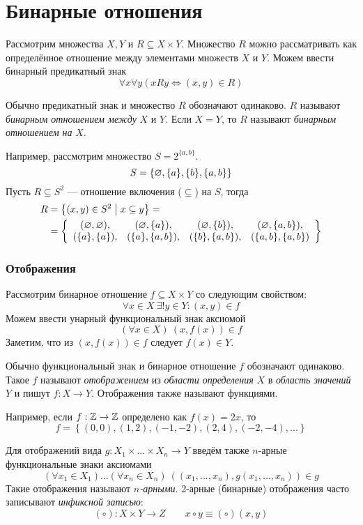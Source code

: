 \part{Бинарные отношения}

Рассмотрим множества $X,Y$ и $R\subseteq X\times Y$. Множество $R$ можно рассматривать
как определённое отношение между элементами множеств $X$ и $Y$. Можем ввести бинарный
предикатный знак
\[
	\forall x\forall y(xRy\iff (x,y)\in R)
\]

Обычно предикатный знак и множество $R$ обозначают одинаково.
$R$ называют {\it бинарным отношением между} $X$ и $Y$. Если $X=Y$,
то $R$ называют {\it бинарным отношением на} $X$.

Например, рассмотрим множество $S=2^{\{a,b\}}$.
\[
	S=\{\varnothing,\{a\},\{b\},\{a,b\}\}
\]
Пусть $R\subseteq S^{2}$ --- отношение включения ($\subseteq$) на $S$, тогда
\[
	\begin{aligned}
		R
		&=\left\{(x,y)\in S^{2}\;\big|\; x\subseteq y\right\}=\\
		&=\left\{
			\begin{array}{cccc}
				(\varnothing,\varnothing),&(\varnothing,\{a\}),&(\varnothing,\{b\}),&(\varnothing,\{a,b\}),\\
				(\{a\},\{a\}),&(\{a\},\{a,b\}),&(\{b\},\{a,b\}),&(\{a,b\},\{a,b\})
			\end{array}\right\}
	\end{aligned}
\]

\section{Отображения}

Рассмотрим бинарное отношение $f\subseteq X\times Y$ со следующим свойством:
\[
	\forall x\in X~\exists! y\in Y:(x,y)\in f
\]
Можем ввести унарный функциональный знак аксиомой
\[
	(\forall x\in X)~(x,f(x))\in f
\]
Заметим, что из $(x,f(x))\in f$ следует $f(x)\in Y$.

Обычно функциональный знак и бинарное отношение $f$ обозначают одинаково.
Такое $f$ называют {\it отображением} из {\it области определения} $X$ в
{\it область значений} $Y$ и пишут $f:X\to Y$.
Отображения также называют функциями.

Например, если $f:\mathbb Z\to\mathbb Z$ определено как $f(x)=2x$, то
\[
	f=\left\{(0,0),(1,2),(-1,-2),(2,4),(-2,-4),...\right\}
\]

Для отображений вида $g:X_1\times ...\times X_{n}\to Y$
введём также $n$-арные функциональные знаки аксиомами
\[
	(\forall x_1\in X_1)...(\forall x_{n}\in X_{n})~
	((x_1,...,x_{n}), g(x_1,...,x_{n}))\in g
\]
Такие отображения называют {\it $n$-арными}. 2-арные (бинарные)
отображения часто записывают {\it инфиксной записью}:
\[
	(\circ):X\times Y\to Z\qquad x\circ y\equiv (\circ)(x,y)
\]

